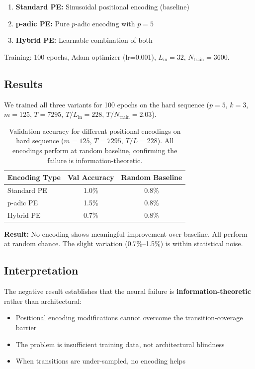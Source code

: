 \documentclass[11pt]{article}
\theoremstyle{plain}
\theoremstyle{definition}
\begin{document}
\begin{enumerate}[leftmargin=2em]
\item \textbf{Standard PE:} Sinusoidal positional encoding (baseline)
\item \textbf{p-adic PE:} Pure $p$-adic encoding with $p=5$
\item \textbf{Hybrid PE:} Learnable combination of both
\end{enumerate}

Training: 100 epochs, Adam optimizer (lr=0.001), $L_{\mathrm{in}}=32$, $N_{\mathrm{train}}=3600$.

\subsection{Results}

We trained all three variants for 100 epochs on the hard sequence ($p=5$, $k=3$, $m=125$, $T=7295$, $T/L_{\mathrm{in}}=228$, $T/N_{\mathrm{train}}=2.03$).

\begin{table}[ht]
\centering
\caption{Validation accuracy for different positional encodings on hard sequence ($m=125$, $T=7295$, $T/L=228$). All encodings perform at random baseline, confirming the failure is information-theoretic.}
\label{tab:padic_pe}
\medskip
\begin{tabular}{@{}lcc@{}}
\toprule
Encoding Type & Val Accuracy & Random Baseline\\
\midrule
Standard PE   & 1.0\% & 0.8\%\\
p-adic PE     & 1.5\% & 0.8\%\\
Hybrid PE     & 0.7\% & 0.8\%\\
\bottomrule
\end{tabular}
\end{table}

\textbf{Result:} No encoding shows meaningful improvement over baseline. All perform at random chance. The slight variation (0.7\%--1.5\%) is within statistical noise.

\subsection{Interpretation}

The negative result establishes that the neural failure is \textbf{information-theoretic} rather than architectural:

\begin{itemize}[leftmargin=2em]
\item Positional encoding modifications cannot overcome the transition-coverage barrier
\item The problem is insufficient training data, not architectural blindness
\item When transitions are under-sampled, no encoding helps
\end{itemize}
\end{document}
